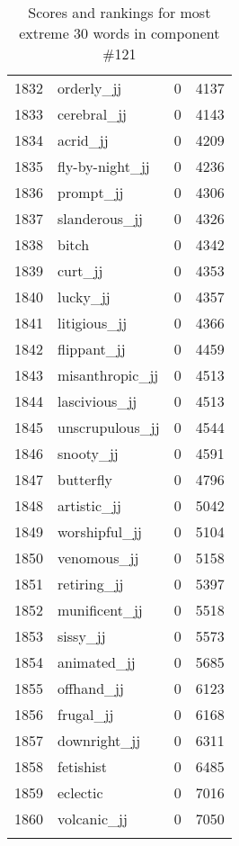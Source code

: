 \begin{longtable}[!htbp]{| rlr@{.}l |}
    1832 & orderly\_jj & 0 & 4137 \\
    1833 & cerebral\_jj & 0 & 4143 \\
    1834 & acrid\_jj & 0 & 4209 \\
    1835 & fly-by-night\_jj & 0 & 4236 \\
    1836 & prompt\_jj & 0 & 4306 \\
    1837 & slanderous\_jj & 0 & 4326 \\
    1838 & bitch & 0 & 4342 \\
    1839 & curt\_jj & 0 & 4353 \\
    1840 & lucky\_jj & 0 & 4357 \\
    1841 & litigious\_jj & 0 & 4366 \\
    1842 & flippant\_jj & 0 & 4459 \\
    1843 & misanthropic\_jj & 0 & 4513 \\
    1844 & lascivious\_jj & 0 & 4513 \\
    1845 & unscrupulous\_jj & 0 & 4544 \\
    1846 & snooty\_jj & 0 & 4591 \\
    1847 & butterfly & 0 & 4796 \\
    1848 & artistic\_jj & 0 & 5042 \\
    1849 & worshipful\_jj & 0 & 5104 \\
    1850 & venomous\_jj & 0 & 5158 \\
    1851 & retiring\_jj & 0 & 5397 \\
    1852 & munificent\_jj & 0 & 5518 \\
    1853 & sissy\_jj & 0 & 5573 \\
    1854 & animated\_jj & 0 & 5685 \\
    1855 & offhand\_jj & 0 & 6123 \\
    1856 & frugal\_jj & 0 & 6168 \\
    1857 & downright\_jj & 0 & 6311 \\
    1858 & fetishist & 0 & 6485 \\
    1859 & eclectic & 0 & 7016 \\
    1860 & volcanic\_jj & 0 & 7050 \\
    \hline
    \caption{Scores and rankings for most extreme 30 words in component \#121} \\
\end{longtable}
